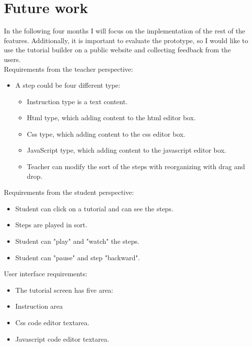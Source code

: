 \documentclass[11pt, a4paper, twoside, openright]{report}
\begin{document}
\section{Future work}

In the following four months I will focus on the implementation of the rest of the features. Additionally, it is important to evaluate the prototype, so I would like to use the tutorial builder on a public website and collecting feedback from the users. \\

\noindent Requirements from the teacher perspective:
\begin{itemize}[noitemsep]
\item A step could be four different type:
\begin{itemize}[noitemsep]
\item Instruction type is a text content.
\item Html type, which adding content to the html editor box.
\item Css type, which adding content to the css editor box.
\item JavaScript type, which adding content to the javascript editor box.
\item Teacher can modify the sort of the steps with reorganizing with drag and drop.
\end{itemize}
\end{itemize}

\noindent Requirements from the student perspective:
\begin{itemize}[noitemsep]
\item Student can click on a tutorial and can see the steps.
\item Steps are played in sort.
\item Student can "play" and "watch" the steps.
\item Student can "pause" and step "backward".
\end{itemize}

\noindent User interface requirements:
\begin{itemize}[noitemsep]
\item The tutorial screen has five area:
\item Instruction area
\item Css code editor textarea.
\item Javascript code editor textarea.
\end{itemize}

\end{document}
